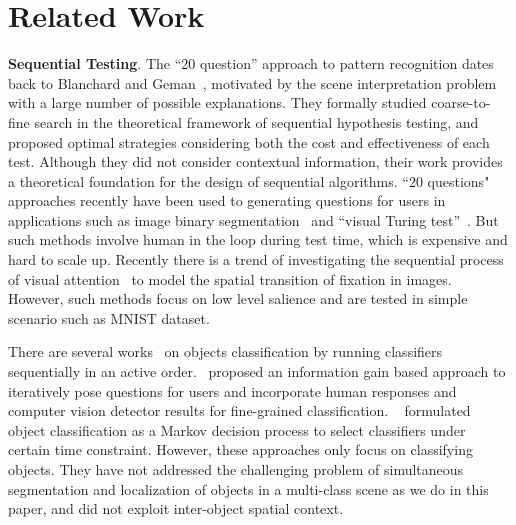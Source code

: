 \section{Related Work}
\label{sec:relatedwork}

{\bf{Sequential Testing}}. 
The ``20 question'' approach to pattern recognition dates back to Blanchard and Geman~\cite{blanchard2005hierarchical}, motivated by the scene interpretation problem with a large number of possible explanations. They formally studied coarse-to-fine search in the theoretical framework of sequential hypothesis testing, and proposed optimal strategies considering both the cost and effectiveness of each test. Although they did not consider contextual information, their work provides a theoretical foundation for the design of sequential algorithms. ``20 questions" approaches recently have been used to generating questions for users in applications such as image binary segmentation~\cite{rupprecht2015image} and ``visual Turing test''~\cite{geman2015visual}. But such methods involve human in the loop during test time, which is expensive and hard to scale up.  Recently there is a trend of investigating the sequential process of visual attention~\cite{ranzato2014learning, larochelle2010learning} to model the spatial transition of fixation in images. However, such methods focus on low level salience and are tested in simple scenario such as MNIST dataset. 

There are several works~\cite{gao2011active} on objects classification by running classifiers sequentially in an active order.~\cite{branson2010visual} proposed an information gain based approach to iteratively pose questions for users and incorporate human responses and computer vision detector results for fine-grained classification.
~\cite{sergey2012timely} formulated object classification as a Markov decision process to select classifiers under certain time constraint. However, these approaches only focus on classifying objects. They have not addressed the challenging problem of simultaneous segmentation and localization of objects in a multi-class scene as we do in this paper, and did not exploit inter-object spatial context.



